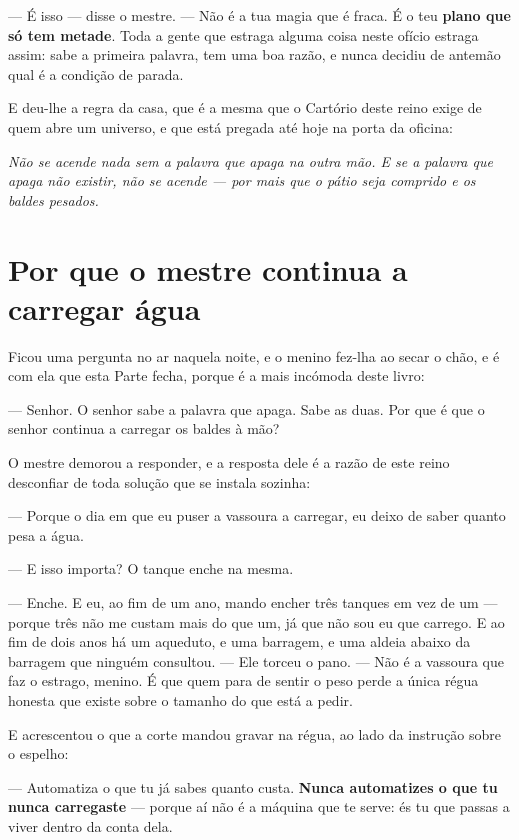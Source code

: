 \documentclass[livro.tex]{subfiles}
\begin{document}
--- É isso --- disse o mestre. --- Não é a tua magia que é fraca. É o teu \textbf{plano
que só tem metade}. Toda a gente que estraga alguma coisa neste ofício estraga assim: sabe
a primeira palavra, tem uma boa razão, e nunca decidiu de antemão qual é a condição de
parada.

\medskip

E deu-lhe a regra da casa, que é a mesma que o Cartório deste reino exige de quem abre um
universo, e que está pregada até hoje na porta da oficina:

\emph{Não se acende nada sem a palavra que apaga na outra mão. E se a palavra que apaga
não existir, não se acende --- por mais que o pátio seja comprido e os baldes pesados.}

\section{Por que o mestre continua a carregar água}

Ficou uma pergunta no ar naquela noite, e o menino fez-lha ao secar o chão, e é com ela
que esta Parte fecha, porque é a mais incómoda deste livro:

--- Senhor. O senhor sabe a palavra que apaga. Sabe as duas. Por que é que o senhor
continua a carregar os baldes à mão?

\medskip

O mestre demorou a responder, e a resposta dele é a razão de este reino desconfiar de toda
solução que se instala sozinha:

--- Porque o dia em que eu puser a vassoura a carregar, eu deixo de saber quanto pesa a
água.

--- E isso importa? O tanque enche na mesma.

--- Enche. E eu, ao fim de um ano, mando encher três tanques em vez de um --- porque três
não me custam mais do que um, já que não sou eu que carrego. E ao fim de dois anos há um
aqueduto, e uma barragem, e uma aldeia abaixo da barragem que ninguém consultou. --- Ele
torceu o pano. --- Não é a vassoura que faz o estrago, menino. É que quem para de sentir o
peso perde a única régua honesta que existe sobre o tamanho do que está a pedir.

\medskip

E acrescentou o que a corte mandou gravar na régua, ao lado da instrução sobre o espelho:

--- Automatiza o que tu já sabes quanto custa. \textbf{Nunca automatizes o que tu nunca
carregaste} --- porque aí não é a máquina que te serve: és tu que passas a viver dentro da
conta dela.
\end{document}
